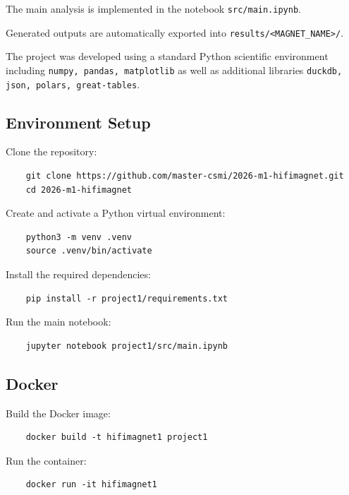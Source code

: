 \documentclass[english,10pt,a4paper]{article}
\begin{document}
The main analysis is implemented in the notebook \texttt{src/main.ipynb}.

Generated outputs are automatically exported into \texttt{results/<MAGNET\_NAME>/}.

The project was developed using a standard Python scientific environment including
\texttt{numpy, pandas, matplotlib} as well as additional libraries \texttt{duckdb, 
json, polars, great-tables}.

\subsection{Environment Setup}

Clone the repository:
\begin{verbatim}
    git clone https://github.com/master-csmi/2026-m1-hifimagnet.git
    cd 2026-m1-hifimagnet
\end{verbatim}

Create and activate a Python virtual environment:
\begin{verbatim}
    python3 -m venv .venv
    source .venv/bin/activate
\end{verbatim}

Install the required dependencies:
\begin{verbatim}
    pip install -r project1/requirements.txt
\end{verbatim}

Run the main notebook:
\begin{verbatim}
    jupyter notebook project1/src/main.ipynb
\end{verbatim}

\subsection{Docker}

Build the Docker image:
\begin{verbatim}
    docker build -t hifimagnet1 project1
\end{verbatim}

Run the container:
\begin{verbatim}
    docker run -it hifimagnet1
\end{verbatim}
\end{document}
